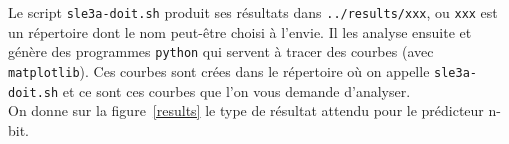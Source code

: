 \documentclass[a4paper]{article}
\begin{document}
Le script \verb+sle3a-doit.sh+ produit ses résultats dans \verb+../results/xxx+, ou \verb+xxx+ est un répertoire dont le nom peut-être choisi à l'envie.
Il les analyse ensuite et génère des programmes \texttt{python} qui servent à tracer des courbes (avec \texttt{matplotlib}). Ces courbes sont crées dans le répertoire où on appelle \verb+sle3a-doit.sh+ et ce sont ces courbes que l'on vous demande d'analyser. \\

On donne sur la figure~\ref{results} le type de résultat attendu pour le prédicteur n-bit.

      \begin{figure}[h]
      \centering
\end{figure}
\end{document}
